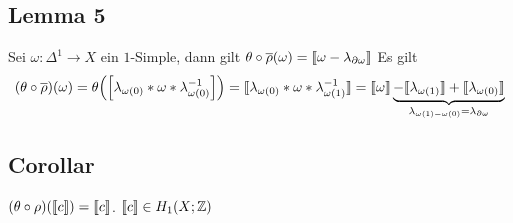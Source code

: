 \subsection{Lemma 5} %
\label{sub:1512}
Sei $\omega \colon \Delta^1 \to X$ ein $1$-Simple, dann gilt $\theta \circ \overline{\rho}(\omega) = \llbracket\omega - \lambda_{\partial \omega}\rrbracket $
Es gilt
\begin{align*}
	(\theta \circ \overline{\rho}) (\omega) = \theta \enbrace*{ \benbrace*{\lambda_{\omega(0)} * \omega * \lambda_{\omega(0)} ^{-1}} } =
	\homologieklasse{\lambda_{\omega(0)} * \omega * \lambda_{\omega(1)} ^{-1}} = \homologieklasse{\omega} \underbrace{- \homologieklasse{\lambda_{\omega(1)}} + 
	\homologieklasse{\lambda_{\omega(0)}} }_{\lambda_{\omega(1)- \omega(0)} = \lambda_{\partial \omega}}
\end{align*}

\subsection{Corollar} %
\label{sub:1513}
$(\theta \circ \rho) \enbrace*{\homologieklasse{c}} = \homologieklasse{c}$. $\llbracket c\rrbracket \in H_1(X;\mathbb{Z})$ 
\cleardoubleoddemptypage
{}
\setcounter{page}{1}
\printindex
\listoffigures
\todototoc
{}

